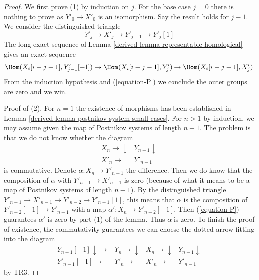 \begin{proof}

We first prove (1) by induction on $j$. For the base case $j = 0$
there is nothing to prove as $Y'_0 \to X'_0$ is an isomorphism.
Say the result holds for $j - 1$. We consider the distinguished triangle
$$
Y'_j \to X'_j \to Y'_{j - 1} \to Y'_j[1]
$$
The long exact sequence of Lemma \ref{derived-lemma-representable-homological}
gives an exact sequence
$$
\Hom(X_i[i - j - 1], Y'_{j - 1}[-1]) \to
\Hom(X_i[i - j - 1], Y'_j) \to
\Hom(X_i[i - j - 1], X'_j)
$$
From the induction hypothesis and (\ref{equation-P}) we conclude the outer
groups are zero and we win.

\medskip\noindent
Proof of (2). For $n = 1$ the existence of morphisms has been
established in Lemma \ref{derived-lemma-postnikov-system-small-cases}.
For $n > 1$ by induction, we may assume given the map of
Postnikov systems of length $n - 1$. The problem is that we do
not know whether the diagram
$$
\begin{array}{cc}X_n \longrightarrow\downarrow & Y_{n - 1} \downarrow \\ X'_n \longrightarrow & Y'_{n - 1}\end{array}
$$
is commutative. Denote $\alpha : X_n \to Y'_{n - 1}$ the difference.
Then we do know that the composition of $\alpha$ with
$Y'_{n - 1} \to X'_{n - 1}$ is zero (because of what it means
to be a map of Postnikov systems of length $n - 1$).
By the distinguished triangle
$Y'_{n - 1} \to X'_{n - 1} \to Y'_{n - 2} \to Y'_{n - 1}[1]$,
this means that $\alpha$ is the composition of
$Y'_{n - 2}[-1] \to Y'_{n - 1}$ with
a map $\alpha' : X_n \to Y'_{n - 2}[-1]$. Then (\ref{equation-P}) guarantees
$\alpha'$ is zero by part (1) of the lemma. Thus $\alpha$ is zero.
To finish the proof of existence, the commutativity guarantees
we can choose the dotted arrow fitting into the diagram
$$
\begin{array}{cccc}Y_{n - 1}[-1] \downarrow\longrightarrow & Y_n \longrightarrow\downarrow & X_n \longrightarrow\downarrow & Y_{n - 1} \downarrow \\ Y'_{n - 1}[-1] \longrightarrow & Y'_n \longrightarrow & X'_n \longrightarrow & Y'_{n - 1}\end{array}
$$
by TR3.
\end{proof}

